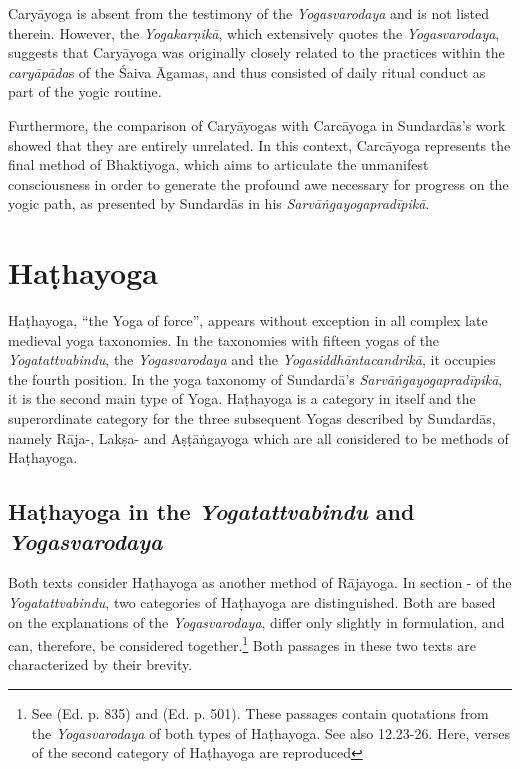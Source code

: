 Caryāyoga is absent from the testimony of the \textit{Yogasvarodaya} and is not listed therein. However, the \textit{Yogakarṇikā}, which extensively quotes the \textit{Yogasvarodaya}, suggests that Caryāyoga was originally closely related to the practices within the \textit{caryāpāda}s of the Śaiva Āgamas, and thus consisted of daily ritual conduct as part of the yogic routine.

Furthermore, the comparison of Caryāyogas with Carcāyoga in Sundardās’s work showed that they are entirely unrelated. In this context, Carcāyoga represents the final method of Bhaktiyoga, which aims to articulate the unmanifest consciousness in order to generate the profound awe necessary for progress on the yogic path, as presented by Sundardās in his \textit{Sarvāṅgayogapradīpikā}.

\section{Haṭhayoga}
\label{hathayogaintro}

Haṭhayoga, ``the Yoga of force'', appears without exception in all complex late medieval yoga taxonomies. In the taxonomies with fifteen yogas of the \textit{Yogatattvabindu}, the \textit{Yogasvarodaya} and the \textit{Yogasiddhāntacandrikā}, it occupies the fourth position. In the yoga taxonomy of Sundardā's \textit{Sarvāṅgayogapradīpikā}, it is the second main type of Yoga. Haṭhayoga is a category in itself and the superordinate category for the three subsequent Yogas described by Sundardās, namely Rāja-, Lakṣa- and Aṣṭāṅgayoga which are all considered to be methods of Haṭhayoga. 

\subsection{Haṭhayoga in the \textit{Yogatattvabindu} and \textit{Yogasvarodaya}}

Both texts consider Haṭhayoga as another method of Rājayoga. In section - of the \textit{Yogatattvabindu}, two categories of Haṭhayoga are distinguished. Both are based on the explanations of the \textit{Yogasvarodaya}, differ only slightly in formulation, and can, therefore, be considered together.\footnote{See  (Ed. p. 835) and  (Ed. p. 501). These passages contain quotations from the \textit{Yogasvarodaya} of both types of Haṭhayoga. See also  12.23-26. Here, verses of the second category of Haṭhayoga are reproduced} Both passages in these two texts are characterized by their brevity. 

